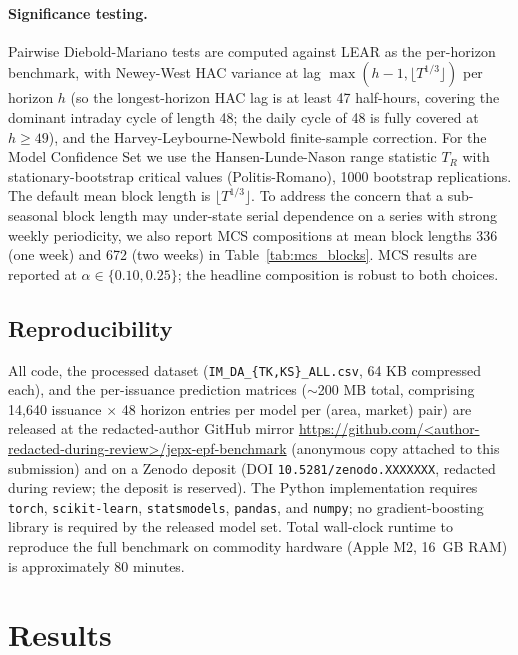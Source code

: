 \documentclass[review,3p,times,authoryear]{elsarticle}
\begin{document}
\paragraph{Significance testing.} Pairwise Diebold-Mariano tests are computed against LEAR as the per-horizon benchmark, with Newey-West HAC variance at lag \(\max(h-1, \lfloor T^{1/3}\rfloor)\) per horizon \(h\) (so the longest-horizon HAC lag is at least 47 half-hours, covering the dominant intraday cycle of length 48; the daily cycle of 48 is fully covered at \(h\geq 49\)), and the Harvey-Leybourne-Newbold finite-sample correction. For the Model Confidence Set we use the Hansen-Lunde-Nason range statistic \(T_R\) with stationary-bootstrap critical values (Politis-Romano), 1000 bootstrap replications. The default mean block length is \(\lfloor T^{1/3}\rfloor\). To address the concern that a sub-seasonal block length may under-state serial dependence on a series with strong weekly periodicity, we also report MCS compositions at mean block lengths 336 (one week) and 672 (two weeks) in Table~\ref{tab:mcs_blocks}. MCS results are reported at \(\alpha\in\{0.10, 0.25\}\); the headline composition is robust to both choices.

\subsection{Reproducibility}
All code, the processed dataset (\texttt{IM\_DA\_\{TK,KS\}\_ALL.csv}, 64 KB compressed each), and the per-issuance prediction matrices (\(\sim\)200 MB total, comprising 14{,}640 issuance \(\times\) 48 horizon entries per model per (area, market) pair) are released at the redacted-author GitHub mirror \url{https://github.com/<author-redacted-during-review>/jepx-epf-benchmark} (anonymous copy attached to this submission) and on a Zenodo deposit (DOI \texttt{10.5281/zenodo.XXXXXXX}, redacted during review; the deposit is reserved). The Python implementation requires \texttt{torch}, \texttt{scikit-learn}, \texttt{statsmodels}, \texttt{pandas}, and \texttt{numpy}; no gradient-boosting library is required by the released model set. Total wall-clock runtime to reproduce the full benchmark on commodity hardware (Apple M2, 16~GB RAM) is approximately 80 minutes.

\section{Results}\label{sec:results}
\end{document}
